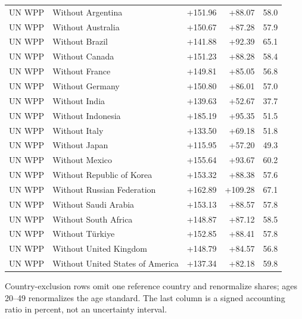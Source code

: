 \documentclass[11pt,a4paper]{article}
\begin{document}
\begin{longtable}{llrrr}
UN WPP & Without Argentina & +151.96 & +88.07 & 58.0\\
UN WPP & Without Australia & +150.67 & +87.28 & 57.9\\
UN WPP & Without Brazil & +141.88 & +92.39 & 65.1\\
UN WPP & Without Canada & +151.23 & +88.28 & 58.4\\
UN WPP & Without France & +149.81 & +85.05 & 56.8\\
UN WPP & Without Germany & +150.80 & +86.01 & 57.0\\
UN WPP & Without India & +139.63 & +52.67 & 37.7\\
UN WPP & Without Indonesia & +185.19 & +95.35 & 51.5\\
UN WPP & Without Italy & +133.50 & +69.18 & 51.8\\
UN WPP & Without Japan & +115.95 & +57.20 & 49.3\\
UN WPP & Without Mexico & +155.64 & +93.67 & 60.2\\
UN WPP & Without Republic of Korea & +153.32 & +88.38 & 57.6\\
UN WPP & Without Russian Federation & +162.89 & +109.28 & 67.1\\
UN WPP & Without Saudi Arabia & +153.13 & +88.57 & 57.8\\
UN WPP & Without South Africa & +148.87 & +87.12 & 58.5\\
UN WPP & Without Türkiye & +152.85 & +88.41 & 57.8\\
UN WPP & Without United Kingdom & +148.79 & +84.57 & 56.8\\
UN WPP & Without United States of America & +137.34 & +82.18 & 59.8\\
\bottomrule

\end{longtable}\normalsize
{\small Country-exclusion rows omit one reference country and renormalize shares; ages 20--49 renormalizes the age standard. The last column is a signed accounting ratio in percent, not an uncertainty interval.}
\clearpage
\end{document}
